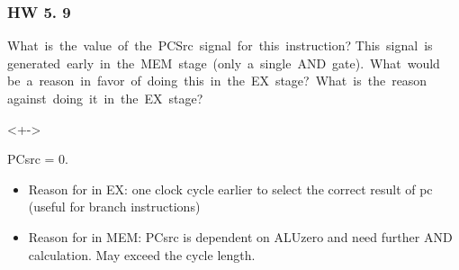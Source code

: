 \documentclass[xcolor=table]{beamer}
\begin{document}
\begin{mdframe}%

\frametitle{HW 5. 9}\label{heading-sec-hw-5-9}%

\noindent{} What  is  the  value  of  the  PCSrc  signal  for  this  instruction?  This  signal  is generated  early  in  the  MEM  stage  (only  a  single  AND  gate).  What  would  be  a  reason  in  favor  of  doing  this  in  the  EX  stage?  What  is  the  reason  against  doing  it  in  the  EX  stage?%

\mdhr{}%

\begin{onlyenv}<+->%

\noindent{}PCsrc = 0.%

\begin{itemize}[noitemsep,topsep=\mdcompacttopsep]%

\item{}Reason for in EX: one clock cycle earlier to select the correct result of pc (useful for branch instructions)%

\item{}Reason for in MEM: PCsrc is dependent on ALUzero and need further AND calculation. May exceed the cycle length.%
\end{itemize}%
\end{onlyenv}%
\end{mdframe}\label{sec-hw-5-9}%
\end{document}
